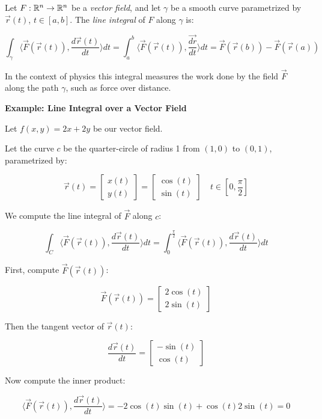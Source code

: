 Let \( F : \mathbb{R}^n \to \mathbb{R}^n \) be a \emph{vector field}, and let \( \gamma \) be a 
smooth curve parametrized by \( \vec{r}(t) \), \( t \in [a, b] \). 
The \emph{line integral} of \(F\) along \( \gamma \) is:

\[
    \int_\gamma \langle \vec{F}(\vec{r}(t)), \frac{d\vec{r}(t)}{dt} \rangle dt = 
    \int_a^b \langle \vec{F}(\vec{r}(t)), \frac{\vec{dr}}{dt} \rangle dt = \vec{F}(\vec{r}(b)) 
    - \vec{F}(\vec{r}(a))
\]

In the context of physics this integral measures the work done by the field \( \vec{F} \) 
along the path \( \gamma \), such as force over distance.

\textbf{Example: Line Integral over a Vector Field}

Let \( f(x, y) = 2x + 2y \) be our vector field. 

Let the curve \(c\) be the quarter-circle of radius 1 from \( (1, 0) \) to \( (0, 1) \), 
parametrized by:

\[
    \vec{r}(t) = 
    \begin{bmatrix}
        x(t) \\ y(t)
    \end{bmatrix}
    =
    \begin{bmatrix}
    \cos(t) \\ \sin(t)
    \end{bmatrix}  
    \quad t \in \left[0, \frac{\pi}{2}\right]
\]

We compute the line integral of \( \vec{F} \) along \(c\):

\[
    \int_C \langle \vec{F}(\vec{r}(t)), \frac{d \vec{r}(t)}{dt}\rangle dt = 
    \int_0^{\frac{\pi}{2}} \langle\vec{F}(\vec{r}(t)), \frac{d \vec{r}(t)}{dt} \rangle dt
\]

First, compute \(\vec{F}(\vec{r}(t))\):

\[
    \vec{F}(\vec{r}(t)) = 
    \begin{bmatrix}
        2\cos(t) \\ 
        2\sin(t)
    \end{bmatrix}
\]

Then the tangent vector of \(\vec{r}(t)\):

\[
    \frac{d \vec{r}(t)}{dt} = 
    \begin{bmatrix}
    -\sin(t) \\ 
    \cos(t)
    \end{bmatrix}
\]

Now compute the inner product:

\[
    \langle\vec{F}(\vec{r}(t)), \frac{d \vec{r}(t)}{dt}\rangle =
    -2\cos(t)\sin(t) + \cos(t)2\sin(t) = 0
\]

